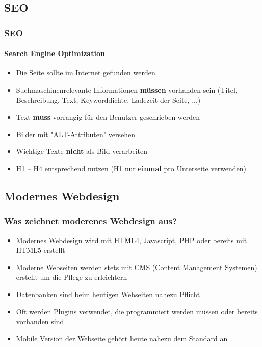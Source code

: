 \documentclass[xcolor=dvipsnames]{beamer}
\begin{document}
\subsection{SEO}
\begin{frame} %
  \frametitle{SEO} %
  \framesubtitle{Search Engine Optimization} %
  \begin{block}{}
	\begin{itemize}
		\item Die Seite sollte im Internet gefunden werden
	\end{itemize}
  \end{block}
  \begin{alertblock}{}
	\begin{itemize}
		\item Suchmaschinenrelevante Informationen \textbf{müssen} vorhanden sein (Titel, Beschreibung, Text, Keyworddichte, Ladezeit der Seite, ...)
		\item Text \textbf{muss} vorrangig für den Benutzer geschrieben werden
		\item Bilder mit "ALT-Attributen" versehen
		\item Wichtige Texte \textbf{nicht} als Bild verarbeiten
		\item H1 – H4 entsprechend nutzen (H1 nur \textbf{einmal} pro Unterseite verwenden)
	\end{itemize}
  \end{alertblock}
\end{frame}


\subsection{Modernes Webdesign}
\begin{frame} %
  \frametitle{Was zeichnet moderenes Webdesign aus?} %
  \begin{block}{}
	\begin{itemize}
		\item Modernes Webdesign wird mit HTML4, Javascript, PHP oder bereits mit HTML5 erstellt
		\item Moderne Webseiten werden stets mit CMS (Content Management Systemen) erstellt um die Pflege zu erleichtern
		\item Datenbanken sind beim heutigen Webseiten nahezu Pflicht
		\item Oft werden Plugins verwendet, die programmiert werden müssen oder bereits vorhanden sind
		\item Mobile Version der Webseite gehört heute nahezu dem Standard an
	\end{itemize}
  \end{block}
\end{frame}
\end{document}
